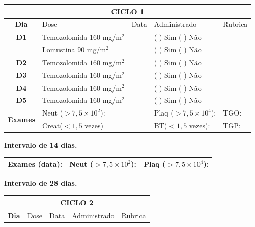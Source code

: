 \documentclass[11pt,a4paper,oldfontcommands]{memoir}
\begin{document}
\begin{center}
\begin{table}[H]
\begin{tabular}{p{1cm}p{5cm}|p{1cm}|p{4.5cm}|p{2cm}}
	\hline
	\multicolumn{5}{c}{\textbf{CICLO 1}}\\
\hline
    \multicolumn{1}{c|}{\multirow{1}{*}{\textbf{Dia}}}&{Dose}&{Data}&{Administrado}&{Rubrica} \\
    \hline
    \multicolumn{1}{c|}{\multirow{1}{*}{\textbf{D1}}}&{Temozolomida \(160\) mg/m\(^2\)}&&{(  ) Sim (  ) Não}&\\
    \multicolumn{1}{c|}{\multirow{1}{*}{\textbf{}}}&{Lomustina \(90\) mg/m\(^2\)}&&{(  ) Sim (  ) Não}&\\
    \multicolumn{1}{c|}{\multirow{1}{*}{\textbf{D2}}}&{Temozolomida \(160\) mg/m\(^2\)}&&{(  ) Sim (  ) Não}&\\
    \multicolumn{1}{c|}{\multirow{1}{*}{\textbf{D3}}}&{Temozolomida \(160\) mg/m\(^2\)}&&{(  ) Sim (  ) Não}&\\
    \multicolumn{1}{c|}{\multirow{1}{*}{\textbf{D4}}}&{Temozolomida \(160\) mg/m\(^2\)}&&{(  ) Sim (  ) Não}&\\
    \multicolumn{1}{c|}{\multirow{1}{*}{\textbf{D5}}}&{Temozolomida \(160\) mg/m\(^2\)}&&{(  ) Sim (  ) Não}&\\
    \hline
    \multicolumn{1}{c|}{\multirow{2}{*}{\textbf{Exames}}}&\multicolumn{2}{l|}{Neut (\(>7,5\times10^2\)):}&{Plaq (\(>7,5\times10^4\)):}&{TGO:}\\
    \cline{2-5}
    \multicolumn{1}{c|}{\multirow{2}{*}{{}}}&\multicolumn{2}{l|}{Creat(\(<1,5\) vezes)}&{BT(\(<1,5\) vezes):}&{TGP:}
    \\
    \hline
\end{tabular}
\end{table}
\textbf{Intervalo de 14 dias.}
\begin{table}[H]
\begin{tabular}{p{5cm}|p{5cm}|p{4.7cm}}
    \hline
    \textbf{Exames (data):}&{Neut (\(>7,5\times10^2\)):}&{Plaq (\(>7,5\times10^4\)):}
    \\
    \hline
\end{tabular}
\end{table}
\textbf{Intervalo de 28 dias.}
\begin{table}[H]
\begin{tabular}{p{1cm}p{5cm}|p{1cm}|p{4.5cm}|p{2cm}}
	\hline
	\multicolumn{5}{c}{\textbf{CICLO 2}}\\
\hline
    \multicolumn{1}{c|}{\multirow{1}{*}{\textbf{Dia}}}&{Dose}&{Data}&{Administrado}&{Rubrica} \\

\end{tabular}
\end{table}
\end{center}
\end{document}
